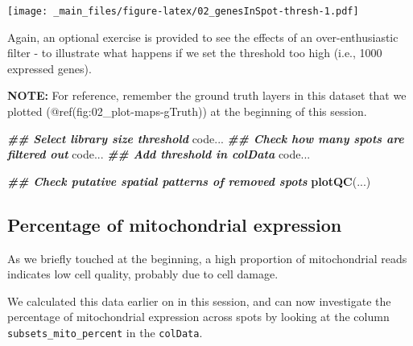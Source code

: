 \documentclass[
]{book}
\newenvironment{Shaded}{\begin{snugshade}}{\end{snugshade}}
\newcommand{\DocumentationTok}[1]{\textcolor[rgb]{0.56,0.35,0.01}{\textbf{\textit{#1}}}}
\newcommand{\FunctionTok}[1]{\textcolor[rgb]{0.13,0.29,0.53}{\textbf{#1}}}
\newcommand{\NormalTok}[1]{#1}
\begin{document}
\texttt{[image: \_main\_files/figure-latex/02\_genesInSpot-thresh-1.pdf]}

Again, an optional exercise is provided to see the effects of an over-enthusiastic filter - to illustrate what happens if we set the threshold too high (i.e., 1000 expressed genes).

\textbf{NOTE:} For reference, remember the ground truth layers in this dataset that we plotted (@ref(fig:02\_plot-maps-gTruth)) at the beginning of this session.

\begin{Shaded}
\begin{Highlighting}[]
\DocumentationTok{\#\# Select library size threshold}
\NormalTok{code...}
\DocumentationTok{\#\# Check how many spots are filtered out}
\NormalTok{code...}
\DocumentationTok{\#\# Add threshold in colData}
\NormalTok{code...}

\DocumentationTok{\#\# Check putative spatial patterns of removed spots}
\FunctionTok{plotQC}\NormalTok{(...)}
\end{Highlighting}
\end{Shaded}

\hypertarget{percentage-of-mitochondrial-expression}{%
\subsection{Percentage of mitochondrial expression}\label{percentage-of-mitochondrial-expression}}

As we briefly touched at the beginning, a high proportion of mitochondrial reads indicates low cell quality, probably due to cell damage.

We calculated this data earlier on in this session, and can now investigate the percentage of mitochondrial expression across spots by looking at the column \texttt{subsets\_mito\_percent} in the \texttt{colData}.
\end{document}
